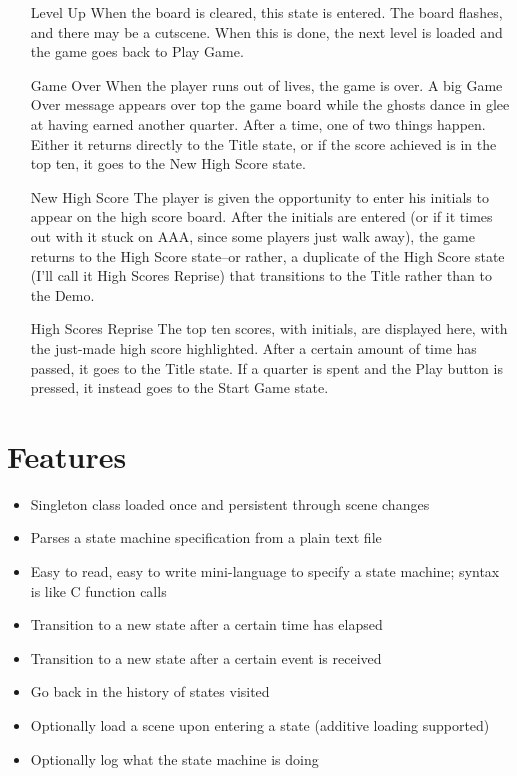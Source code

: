 \documentclass[letter,12pt]{article}
\begin{document}
\begin{enumerate}
\item[Level Up] When the board is cleared, this state is entered.  The board flashes, and there may be a cutscene.  When this is done, the next level is loaded and the game goes back to Play Game.

\item[Game Over] When the player runs out of lives, the game is over.  A big Game Over message appears over top the game board while the ghosts dance in glee at having earned another quarter.  After a time, one of two things happen.  Either it returns directly to the Title state, or if the score achieved is in the top ten, it goes to the New High Score state.

\item[New High Score] The player is given the opportunity to enter his initials to appear on the high score board.  After the initials are entered (or if it times out with it stuck on AAA, since some players just walk away), the game returns to the High Score state--or rather, a duplicate of the High Score state (I’ll call it High Scores Reprise) that transitions to the Title rather than to the Demo.

\item[High Scores Reprise] The top ten scores, with initials, are displayed here, with the just-made high score highlighted.  After a certain amount of time has passed, it goes to the Title state.  If a quarter is spent and the Play button is pressed, it instead goes to the Start Game state.
\end{enumerate}

\section{Features}

\begin{itemize}
\item Singleton class loaded once and persistent through scene changes
\item Parses a state machine specification from a plain text file
\item Easy to read, easy to write mini-language to specify a state machine; syntax is like C function calls
\item Transition to a new state after a certain time has elapsed
\item Transition to a new state after a certain event is received
\item Go back in the history of states visited
\item Optionally load a scene upon entering a state (additive loading supported)
\item Optionally log what the state machine is doing

\end{itemize}
\end{document}
